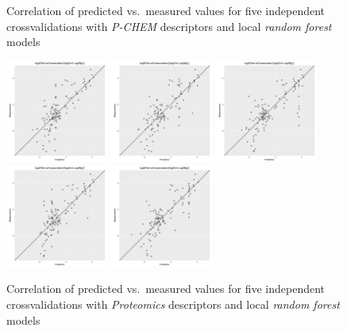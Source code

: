 \documentclass[utf8]{frontiersHLTH} %
\begin{document}
\begin{figure}[H]
\caption{Correlation of predicted vs.~measured values for five
independent crossvalidations with \emph{P-CHEM} descriptors and local
\emph{random forest} models}

\label{fig:pchem}

\end{figure}

\begin{figure}[H]

\includegraphics[width=0.3000\textwidth]{figures/Proteomics-rf-0.pdf}\label{fig:prot0}
\includegraphics[width=0.3000\textwidth]{figures/Proteomics-rf-1.pdf}\label{fig:prot1}
\includegraphics[width=0.3000\textwidth]{figures/Proteomics-rf-2.pdf}\label{fig:prot2}
\includegraphics[width=0.3000\textwidth]{figures/Proteomics-rf-3.pdf}\label{fig:prot3}
\includegraphics[width=0.3000\textwidth]{figures/Proteomics-rf-4.pdf}\label{fig:prot4}

\caption{Correlation of predicted vs.~measured values for five
independent crossvalidations with \emph{Proteomics} descriptors and
local \emph{random forest} models}

\label{fig:prot}

\end{figure}
\end{document}
